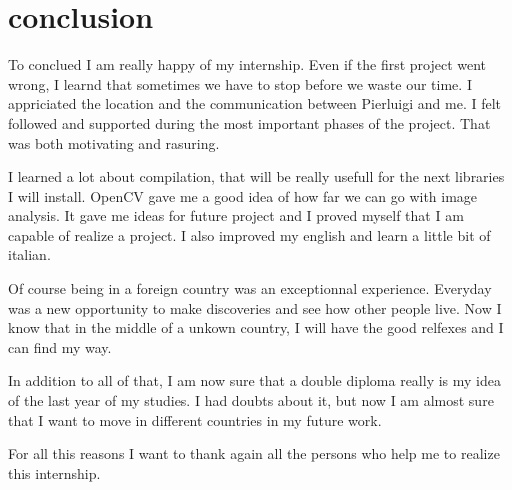 \chapter{conclusion}

\par To conclued I am really happy of my internship. Even if the first project went wrong, I learnd that sometimes we have to stop before we waste our time. I appriciated the location and the communication between Pierluigi and me. I felt followed and supported during the most important phases of the project. That was both motivating and rasuring.
\par I learned a lot about compilation, that will be really usefull for the next libraries I will install. OpenCV gave me a good idea of how far we can go with image analysis. It gave me ideas for future project and I proved myself that I am capable of realize a project. I also improved my english and learn a little bit of italian. 
\par Of course being in a foreign country was an exceptionnal experience. Everyday was a new opportunity to make discoveries and see how other people live. Now I know that in the middle of a unkown country, I will have the good relfexes and I can find my way.
\par In addition to all of that, I am now sure that a double diploma really is my idea of the last year of my studies. I had doubts about it, but now I am almost sure that I want to move in different countries in my future work.
\par For all this reasons I want to thank again all the persons who help me to realize this internship.